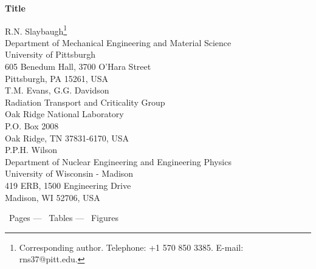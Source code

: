 \documentclass[preprint,12pt]{elsarticle}
\renewcommand{\thetable}{\Roman{table}}
\begin{document}
\singlespacing
\begin{center}

  {\Large \bf Title}
  
  \vspace{0.3in}
  
  {\large R.N. Slaybaugh\footnote{Corresponding author.  Telephone: +1
      570 850 3385.  E-mail: rns37@pitt.edu.}\\
    Department of Mechanical Engineering and Material Science\\
    University of Pittsburgh\\
    605 Benedum Hall, 3700 O'Hara Street\\
    Pittsburgh, PA 15261, USA\\\vspace{1\baselineskip}
    T.M. Evans, G.G. Davidson\\
    Radiation Transport and Criticality Group\\ 
    Oak Ridge National Laboratory\\ 
    P.O. Box 2008\\
    Oak Ridge, TN 37831-6170, USA\\\vspace{1\baselineskip}
    P.P.H. Wilson\\
    Department of Nuclear Engineering and Engineering Physics\\
    University of Wisconsin - Madison\\
    419 ERB, 1500 Engineering Drive\\
    Madison, WI 52706, USA\\}
  
  \addtocounter{page}{-1}

  \vspace{2.0in}
  \renewcommand{\thetable}{}
  \thepage\ Pages --- \thetable\ Tables --- \thefigure\ Figures \\

  \setcounter{page}{1}

\end{center}

\end{document}
